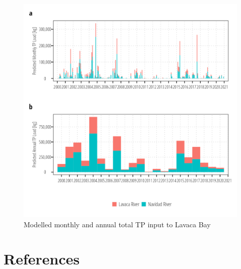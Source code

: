 \documentclass[
]{article}
\begin{document}
\begin{figure}[h]

{\centering \includegraphics{load_estimates_files/figure-pdf/tp_total_export-1.png}

}

\caption{Modelled monthly and annual total TP input to Lavaca Bay}

\end{figure}

\clearpage

\hypertarget{references}{%
\section*{References}\label{references}}
\end{document}
